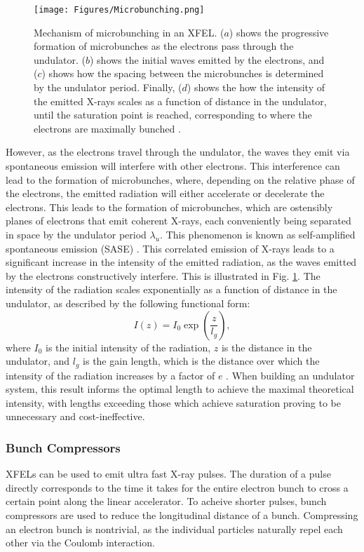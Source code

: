 \documentclass[aps,prb,twocolumn,superscriptaddress]{revtex4-2}
\begin{document}
\begin{figure}[h]
    \centering
    \texttt{[image: Figures/Microbunching.png]}
    \caption{Mechanism of microbunching in an XFEL. ($a$) shows the progressive
        formation of microbunches as the electrons pass through the undulator.
        ($b$) shows the initial waves emitted by the electrons, and ($c$) shows
        how the spacing between the microbunches is determined by the undulator
        period. Finally, ($d$) shows the how the intensity of the emitted X-rays
        scales as a function of distance in the undulator, until the saturation
        point is reached, corresponding to where the electrons are maximally 
        bunched \cite{EMMA}.}
    \label{fig:Undulator}
\end{figure}
However, as the electrons travel through the
undulator, the waves they emit via spontaneous emission will interfere with 
other electrons. This interference can lead to the formation of microbunches,
where, depending on the relative phase of the electrons, the emitted radiation
will either accelerate or decelerate the electrons. This leads to the formation
of microbunches, which are ostensibly planes of electrons that emit coherent
X-rays, each conveniently being separated in space by the undulator period
$\lambda_u$. This phenomenon is known as self-amplified spontaneous emission 
(SASE) \cite{Saldin2006}.
This correlated emission of X-rays leads to a significant increase in the intensity
of the emitted radiation, as the waves emitted by the electrons constructively
interfere. This is illustrated in Fig. \ref{fig:Undulator}. The intensity of the
radiation scales exponentially as a function of distance in the undulator, as described 
by the following functional form:
\begin{equation}
    I(z) = I_0\exp\left(\frac{z}{l_g}\right),
\end{equation}
where $I_0$ is the initial intensity of the radiation, $z$ is the distance in the
undulator, and $l_g$ is the gain length, which is the distance over which the
intensity of the radiation increases by a factor of $e$ \cite{Bonifacio}. When 
building an undulator system, this result informs the optimal length to achieve 
the maximal theoretical intensity, with lengths exceeding those which achieve saturation 
proving to be unnecessary and cost-ineffective.

\subsubsection{Bunch Compressors}
XFELs can be used to emit ultra fast X-ray pulses. The duration of a pulse
directly corresponds to the time it takes for the entire electron bunch to 
cross a certain point along the linear accelerator. To acheive shorter pulses,
bunch compressors are used to reduce the longitudinal distance of a bunch. 
Compressing an electron bunch is nontrivial, as the individual particles 
naturally repel each other via the Coulomb interaction. 
\end{document}
